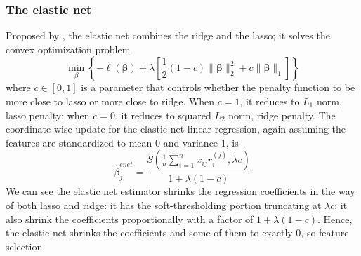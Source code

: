 \subsubsection{The elastic net}
Proposed by \cite{zou2005regularization}, the elastic net combines the ridge and the lasso; it solves the convex optimization problem
\begin{equation}
    \min_{\beta} \left\{ -\ell(\bm{\beta})+\lambda\left[\frac{1}{2}(1-c)\|\bm{\beta}\|_2^2+c\|\bm{\beta}\|_1\right] \label{eq1.10} \right\} 
\end{equation}
where $c\in [0,1]$ is a parameter that controls whether the penalty function to be more close to lasso or more close to ridge. When $c=1$, it reduces to $L_1$ norm, lasso penalty; when $c=0$, it reduces to squared $L_2$ norm, ridge penalty. The coordinate-wise update for the elastic net linear regression, again assuming the features are standardized to mean 0 and variance 1, is 
\begin{equation}
    \hat{\beta}_j^{enet} = \frac{S(\frac{1}{n}\sum_{i=1}^{n}x_{ij}r_i^{(j)}, \lambda c)}{1+\lambda(1-c)} \label{eq1.11}
\end{equation}
We can see the elastic net estimator shrinks the regression coefficients in the way of both lasso and ridge: it has the soft-thresholding portion truncating at $\lambda c$; it also shrink the coefficients proportionally with a factor of $1+\lambda(1-c)$. Hence, the elastic net shrinks the coefficients and some of them to exactly 0, so feature selection.

